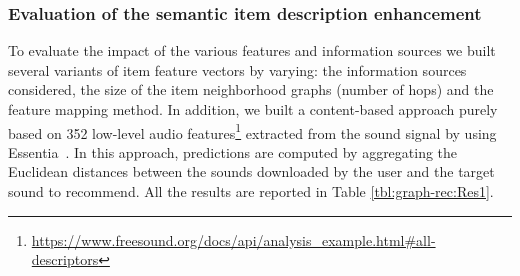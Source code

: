 \subsubsection{Evaluation of the semantic item description enhancement}\label{sem_eval}
To evaluate the impact of the various features and information sources we built several variants of item feature vectors by varying: the information sources considered, the size of the item neighborhood graphs (number of hops) and the feature mapping method. 
In addition, we built a content-based approach purely based on 352 low-level audio features\footnote{\url{https://www.freesound.org/docs/api/analysis_example.html\#all-descriptors}} extracted from the sound signal by using Essentia~\citep{Bogdanov2013}. In this approach, predictions are computed by aggregating the Euclidean distances between the sounds downloaded by the user and the target sound to recommend. %
All the results are reported in Table \ref{tbl:graph-rec:Res1}. 

